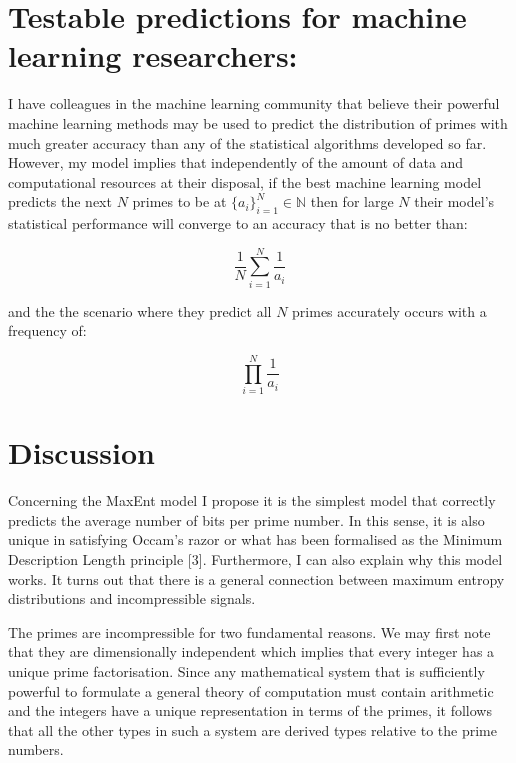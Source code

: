 \documentclass{article}
\begin{document}
\newpage 

\section{Testable predictions for machine learning researchers:}

I have colleagues in the machine learning community that believe their powerful machine learning methods may be used to predict the distribution of primes with much greater accuracy than any of the statistical algorithms developed so far. However, my model implies that independently of the amount of data and computational resources at their disposal, if the best machine learning model predicts the next $N$ primes to be at $\{a_i\}_{i=1}^N \in \mathbb{N}$ then for large $N$ their model's statistical performance will converge to an accuracy that is no better than:

\begin{equation}
\frac{1}{N}\sum_{i=1}^N \frac{1}{a_i}
\end{equation}

and the the scenario where they predict all $N$ primes accurately occurs with a frequency of:

\begin{equation}
\prod_{i=1}^N \frac{1}{a_i}
\end{equation}

\section{Discussion}

Concerning the MaxEnt model I propose it is the simplest model that correctly predicts the average number of bits per prime number. In this sense, it is also unique in satisfying Occam's razor or what has been formalised as the Minimum Description Length principle [3]. Furthermore, I can also explain why this model works. It turns out that there is a general connection between maximum entropy distributions and incompressible signals.

The primes are incompressible for two fundamental reasons. We may first note that they are dimensionally independent which implies that every integer has a unique prime factorisation. Since any mathematical system that is sufficiently powerful to formulate a general theory of computation must contain arithmetic and the integers have a unique representation in terms of the primes, it follows that all the other types in such a system are derived types relative to the prime numbers.
\end{document}
